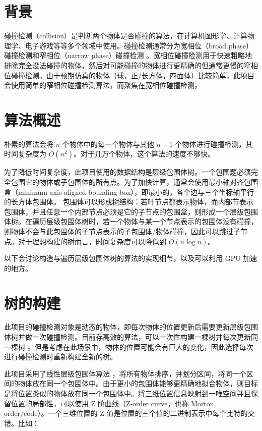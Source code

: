 \section{背景}

碰撞检测（collision）是判断两个物体是否碰撞的算法，在计算机图形学、计算物理学、电子游戏等等多个领域中使用。碰撞检测通常分为宽相位（broad phase）碰撞检测和窄相位（narrow phase）碰撞检测 \cite{nvidiaCollisionDetection}。宽相位碰撞检测用于快速粗略地排除完全没法碰撞的物体，然后对可能碰撞的物体进行更精确的但通常更慢的窄相位碰撞检测。由于预期仿真的物体（球，正/长方体，四面体）比较简单，此项目会使用简单的窄相位碰撞检测算法，而聚焦在宽相位碰撞检测。

\section{算法概述}

朴素的算法会将 $n$ 个物体中的每一个物体与其他 $n-1$ 个物体进行碰撞检测，其时间复杂度为 $O(n^2)$。对于几万个物体，这个算法的速度不够快。

为了降低时间复杂度，此项目使用的数据结构是层级包围体树。一个包围题必须完全包围它的物体或子包围体的所有点。为了加快计算，通常会使用最小轴对齐包围盒（minimum axis-aligned bounding box），即最小的，各个边与三个坐标轴平行的长方体包围体。
包围体可以形成树结构：若叶节点都表示物体，而内部节表示包围体，并且任意一个内部节点必须是它的子节点的包围盒，则形成一个层级包围体树。在遍历层级包围体树时，若一个物体与某一个节点表示的包围体没有碰撞，则物体不会与此包围体的子节点表示的子包围体/物体碰撞，因此可以跳过子节点。对于理想构建的树而言，时间复杂度可以降低到 $O(n\log n)$。

以下会讨论构造与遍历层级包围体树的算法的实现细节，以及可以利用 GPU 加速的地方。

\section{树的构建}

此项目的碰撞检测对象是动态的物体，即每次物体的位置更新后需要更新层级包围体树并做一次碰撞检测。目前存高效的算法，可以一次性构建一棵树并每次更新同一棵树 \cite{Wald2008}。但是考虑在此场景中，物体的位置可能会有巨大的变化，因此选择每次进行碰撞检测时重新构建全新的树。

此项目采用了线性层级包围体算法 \cite{Lauterbach2009}，将所有物体排序，并划分区间，将同一个区间的物体放在同一个包围体中。由于更小的包围体能够更精确地拟合物体，则目标是将位置类似的物体放在同一个包围体中。将三维位置信息映射到一唯空间并且保留位置的局部性，可以使用 Z 阶曲线（Z-order curve，也称 Morton order/code）\cite{wikipediaZorderCurve}。一个三维位置的 Z 值是位置的三个值的二进制表示中每个比特的交错。比如：


